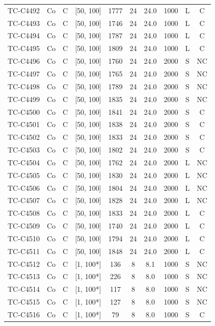 \begin{longtable}{lccccccccc}
TC-C4492 & Co & C & [50, 100] & 1777 & 24 & 24.0 & 1000 & L & C \\
TC-C4493 & Co & C & [50, 100] & 1746 & 24 & 24.0 & 1000 & L & C \\
TC-C4494 & Co & C & [50, 100] & 1787 & 24 & 24.0 & 1000 & L & C \\
TC-C4495 & Co & C & [50, 100] & 1809 & 24 & 24.0 & 1000 & L & C \\
TC-C4496 & Co & C & [50, 100] & 1760 & 24 & 24.0 & 2000 & S & NC \\
TC-C4497 & Co & C & [50, 100] & 1765 & 24 & 24.0 & 2000 & S & NC \\
TC-C4498 & Co & C & [50, 100] & 1789 & 24 & 24.0 & 2000 & S & NC \\
TC-C4499 & Co & C & [50, 100] & 1835 & 24 & 24.0 & 2000 & S & NC \\
TC-C4500 & Co & C & [50, 100] & 1841 & 24 & 24.0 & 2000 & S & C \\
TC-C4501 & Co & C & [50, 100] & 1838 & 24 & 24.0 & 2000 & S & C \\
TC-C4502 & Co & C & [50, 100] & 1833 & 24 & 24.0 & 2000 & S & C \\
TC-C4503 & Co & C & [50, 100] & 1802 & 24 & 24.0 & 2000 & S & C \\
TC-C4504 & Co & C & [50, 100] & 1762 & 24 & 24.0 & 2000 & L & NC \\
TC-C4505 & Co & C & [50, 100] & 1830 & 24 & 24.0 & 2000 & L & NC \\
TC-C4506 & Co & C & [50, 100] & 1804 & 24 & 24.0 & 2000 & L & NC \\
TC-C4507 & Co & C & [50, 100] & 1828 & 24 & 24.0 & 2000 & L & NC \\
TC-C4508 & Co & C & [50, 100] & 1833 & 24 & 24.0 & 2000 & L & C \\
TC-C4509 & Co & C & [50, 100] & 1740 & 24 & 24.0 & 2000 & L & C \\
TC-C4510 & Co & C & [50, 100] & 1794 & 24 & 24.0 & 2000 & L & C \\
TC-C4511 & Co & C & [50, 100] & 1848 & 24 & 24.0 & 2000 & L & C \\
TC-C4512 & Co & C & [1, 100*] & 136 & 8 & 8.1 & 1000 & S & NC \\
TC-C4513 & Co & C & [1, 100*] & 226 & 8 & 8.0 & 1000 & S & NC \\
TC-C4514 & Co & C & [1, 100*] & 117 & 8 & 8.0 & 1000 & S & NC \\
TC-C4515 & Co & C & [1, 100*] & 127 & 8 & 8.0 & 1000 & S & NC \\
TC-C4516 & Co & C & [1, 100*] & 79 & 8 & 8.0 & 1000 & S & C \\

\end{longtable}

